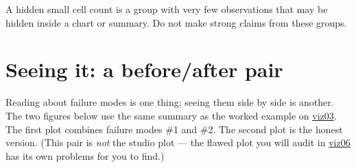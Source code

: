 \documentclass[
  letterpaper,
  DIV=11,
  numbers=noendperiod,
  oneside]{scrreprt}
\begin{document}
\begin{tcolorbox}[enhanced jigsaw, title=\textcolor{quarto-callout-note-color}{\faInfo}\hspace{0.5em}{Definition: hidden small cell count}, arc=.35mm, toptitle=1mm, colframe=quarto-callout-note-color-frame, toprule=.15mm, leftrule=.75mm, bottomtitle=1mm, opacityback=0, bottomrule=.15mm, coltitle=black, breakable, opacitybacktitle=0.6, titlerule=0mm, colback=white, left=2mm, colbacktitle=quarto-callout-note-color!10!white, rightrule=.15mm]

A hidden small cell count is a group with very few observations that may
be hidden inside a chart or summary. Do not make strong claims from
these groups.

\end{tcolorbox}

\section*{Seeing it: a before/after
pair}\label{seeing-it-a-beforeafter-pair}


Reading about failure modes is one thing; seeing them side by side is
another. The two figures below use the same summary as the worked
example on
\hyperref[worked-example-descriptive-bmi-visualization]{viz03}. The
first plot combines failure modes \#1 and \#2. The second plot is the
honest version. (This pair is \emph{not} the studio plot --- the flawed
plot you will audit in \href{viz06-studio-visual-audit.qmd}{viz06} has
its own problems for you to find.)
\end{document}
